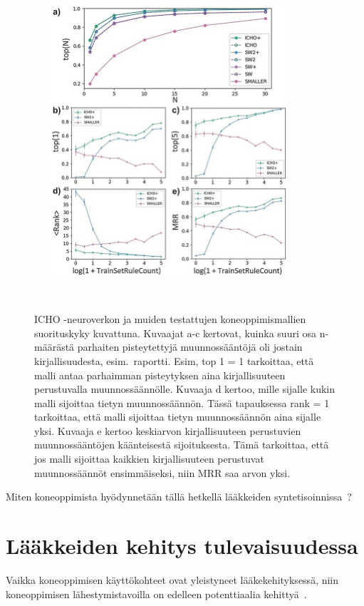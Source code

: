 \documentclass[finnish,twoside,censored,tkt,sw-line]{HYthesisML}
\begin{document}
\begin{figure}[ht]
    \centering
    \includegraphics[width=10cm, height=10cm]{icho-performance-fig.jpg}
    \caption{
        ICHO -neuroverkon ja muiden testattujen koneoppimismallien suorituskyky kuvattuna.
        Kuvaajat a-c kertovat, kuinka suuri osa n-määrästä parhaiten pisteytettyjä muunnossääntöjä oli jostain kirjallisuudesta, esim.\ raportti.
        Esim, top 1 = 1 tarkoittaa, että malli antaa parhaimman pisteytyksen aina kirjallisuuteen perustuvalla muunnossäännölle.
        Kuvaaja d kertoo, mille sijalle kukin malli sijoittaa tietyn muunnossäännön.
        Tässä tapauksessa rank = 1 tarkoittaa, että malli sijoittaa tietyn muunnossäännön aina sijalle yksi.
        Kuvaaja e kertoo keskiarvon kirjallisuuteen perustuvien muunnossääntöjen käänteisestä sijoituksesta.
        Tämä tarkoittaa, että jos malli sijoittaa kaikkien kirjallisuuteen perustuvat muunnossäännöt ensimmäiseksi, niin MRR saa arvon yksi.
    }
    {~\cite{ExpertKnowledgeRetorsynthesis}}
\end{figure}

Miten koneoppimista hyödynnetään tällä hetkellä lääkkeiden syntetisoinnissa~\cite{SeglerMarwinHS2018Pcsw,ShaharHarelAndKiraRadinsky,ShinBonggun}?

\chapter{Lääkkeiden kehitys tulevaisuudessa}

Vaikka koneoppimisen käyttökohteet ovat yleistyneet lääkekehityksessä, niin koneoppimisen lähestymistavoilla on edelleen potenttiaalia kehittyä~\cite{ButlerKeithT2018Mlfm}.
\end{document}

